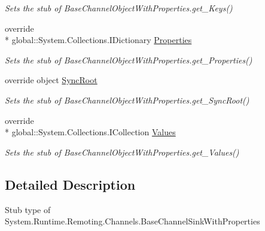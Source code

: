 \begin{DoxyCompactItemize}
\begin{DoxyCompactList}\small\item\em Sets the stub of Base\-Channel\-Object\-With\-Properties.\-get\-\_\-\-Keys()\end{DoxyCompactList}\item 
override \\*
global\-::\-System.\-Collections.\-I\-Dictionary \hyperlink{class_system_1_1_runtime_1_1_remoting_1_1_channels_1_1_fakes_1_1_stub_base_channel_sink_with_properties_a818a47b4fb95c6fbb530e0edcaeff41e}{Properties}
\begin{DoxyCompactList}\small\item\em Sets the stub of Base\-Channel\-Object\-With\-Properties.\-get\-\_\-\-Properties()\end{DoxyCompactList}\item 
override object \hyperlink{class_system_1_1_runtime_1_1_remoting_1_1_channels_1_1_fakes_1_1_stub_base_channel_sink_with_properties_a73bd51854b2cb7156fddc1aa77868d51}{Sync\-Root}
\begin{DoxyCompactList}\small\item\em Sets the stub of Base\-Channel\-Object\-With\-Properties.\-get\-\_\-\-Sync\-Root()\end{DoxyCompactList}\item 
override \\*
global\-::\-System.\-Collections.\-I\-Collection \hyperlink{class_system_1_1_runtime_1_1_remoting_1_1_channels_1_1_fakes_1_1_stub_base_channel_sink_with_properties_aea17967b8f875386466c9edfc69797dd}{Values}
\begin{DoxyCompactList}\small\item\em Sets the stub of Base\-Channel\-Object\-With\-Properties.\-get\-\_\-\-Values()\end{DoxyCompactList}\end{DoxyCompactItemize}


\subsection{Detailed Description}
Stub type of System.\-Runtime.\-Remoting.\-Channels.\-Base\-Channel\-Sink\-With\-Properties



